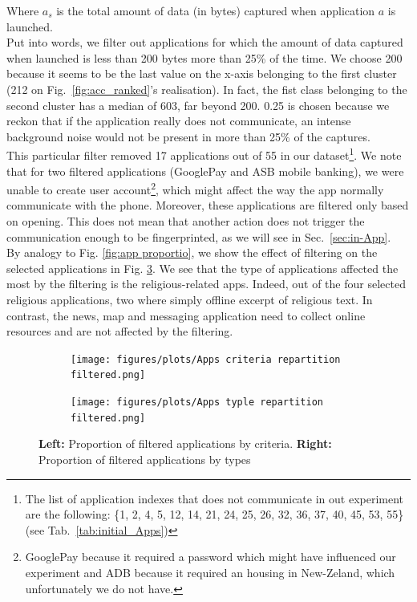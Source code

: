 Where $a_s$  is the total amount of data (in bytes) captured when application $a$ is launched.
\\

Put into words, we filter out applications for which the amount of data captured when launched is less than 200 bytes more than 25\% of the time. We choose 200 because it seems to be the last value on the x-axis belonging to the first cluster (212 on Fig.~\ref{fig:acc_ranked}'s realisation). In fact, the fist class belonging to the second cluster has a median of 603, far beyond 200. 0.25 is chosen because we reckon that if the application really does not communicate, an intense background noise would not be present in more than 25\% of the captures.
\\ 

This particular filter removed 17 applications out of 55 in our dataset\footnote{The list of application indexes that does not communicate in out experiment are the following: \{1, 2, 4, 5, 12, 14, 21, 24, 25, 26, 32, 36, 37, 40, 45, 53, 55\} (see Tab.~\ref{tab:initial_Apps})}. We note that for two filtered applications (GooglePay and ASB mobile banking), we were unable to create user account\footnote{GooglePay because it required a password which might have influenced our experiment and ADB because it required an housing in New-Zeland, which unfortunately we do not have.}, which might affect the way the app normally communicate with the phone. Moreover, these applications are filtered only based on opening. This does not mean that another action does not trigger the communication enough to be fingerprinted, as we will see in Sec.~\ref{sec:in-App}. 
\\

By analogy to Fig. \ref{fig:app proportio}, we show the effect of filtering on the selected applications in Fig. \ref{fig:app proportion filtered}. We see that the type of applications affected the most by the filtering is the religious-related apps. Indeed, out of the four selected religious applications, two where simply offline excerpt of religious text. In contrast, the news, map and messaging application need to collect online resources and are not affected by the filtering.

\begin{figure}[h]
\centering
\begin{subfigure}{.5\textwidth}
 \centering
  \texttt{[image: figures/plots/Apps criteria repartition filtered.png]}
  \label{fig:sub1}
\end{subfigure}%
\begin{subfigure}{.5\textwidth}
  \centering
  \texttt{[image: figures/plots/Apps typle repartition filtered.png]}
  \label{fig:sub2}
\end{subfigure}
\caption{\textbf{Left:} Proportion of filtered applications by criteria. \textbf{Right:} Proportion of filtered applications by types}
\label{fig:app proportion filtered}
\end{figure}



